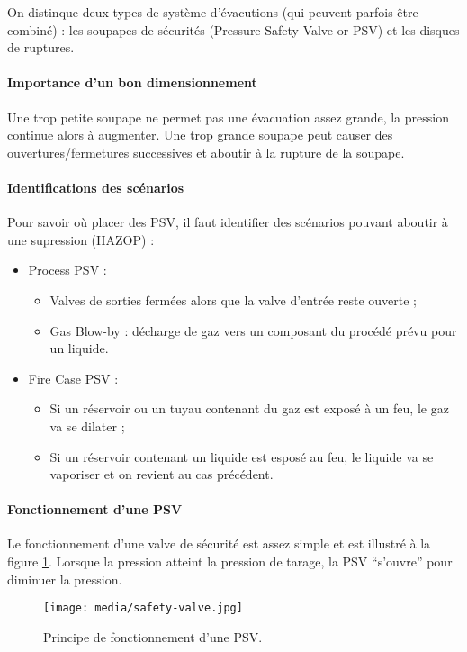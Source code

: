 On distinque deux types de système d'évacutions (qui peuvent
parfois être combiné) : les soupapes de sécurités (Pressure
Safety Valve or PSV) et les disques de ruptures.

\paragraph{Importance d'un bon dimensionnement}
Une trop petite soupape ne permet pas une évacuation
assez grande, la pression continue alors à augmenter.
Une trop grande soupape peut causer des
ouvertures/fermetures successives et aboutir à la
rupture de la soupape.

\paragraph{Identifications des scénarios}
Pour savoir où placer des PSV, il faut identifier des scénarios
pouvant aboutir à une supression (HAZOP) :
\begin{itemize}
	\item Process PSV :
		\begin{itemize}
			\item Valves de sorties fermées alors que la valve
			d'entrée reste ouverte ;
			\item Gas Blow-by : décharge de gaz vers un composant
			du procédé prévu pour un liquide.
		\end{itemize}
	\item Fire Case PSV :
		\begin{itemize}
			\item	Si un réservoir ou un tuyau contenant du gaz
			est exposé à un feu, le gaz va se dilater ;
			\item Si un réservoir contenant un liquide est esposé
			au feu, le liquide va se vaporiser et on revient au
			cas précédent.
		\end{itemize}
\end{itemize}

\paragraph{Fonctionnement d'une PSV}
Le fonctionnement d'une valve de sécurité est assez
simple et est illustré à la figure \ref{fig:safety-valve}.
Lorsque la pression atteint la pression de tarage,
la PSV ``s'ouvre'' pour diminuer la pression.

\begin{figure}[ht]
	\centering
	\texttt{[image: media/safety-valve.jpg]}
	\caption{Principe de fonctionnement d'une PSV.}
	\label{fig:safety-valve}
\end{figure}

